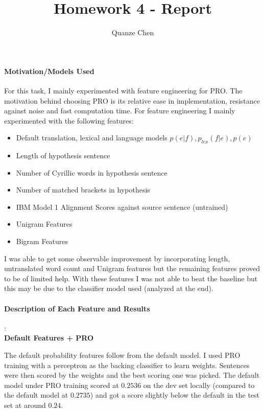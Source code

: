 \documentclass{article}
\title{Homework 4 - Report}
\author{Quanze Chen}
\begin{document}
\thispagestyle{plain}\maketitle

\paragraph{Motivation/Models Used}
For this task, I mainly experimented with feature engineering for PRO. The motivation behind choosing PRO is its relative ease in implementation, resistance against noise and fast computation time. For feature engineering I mainly experimented with the following features:

\begin{itemize}
\item Default translation, lexical and language models $p(e|f), p_{lex} (f|e), p(e)$
\item Length of hypothesis sentence
\item Number of Cyrillic words in hypothesis sentence
\item Number of matched brackets in hypothesis
\item IBM Model 1 Alignment Scores against source sentence (untrained)
\item Unigram Features
\item Bigram Features
\end{itemize} 

I was able to get some observable improvement by incorporating length, untranslated word count and Unigram features but the remaining features proved to be of limited help. With these features I was not able to beat the baseline but this may be due to the classifier model used (analyzed at the end).

\paragraph{Description of Each Feature and Results} :\\

{\bf Default Features + PRO}

The default probability features follow from the default model. I used PRO training with a perceptron as the backing classifier to learn weights. Sentences were then scored by the weights and the best scoring one was picked. The default model under PRO training scored at $0.2536$ on the dev set locally (compared to the default model at $0.2735$) and got a score slightly below the default in the test set at around $0.24$.\\
\end{document}
